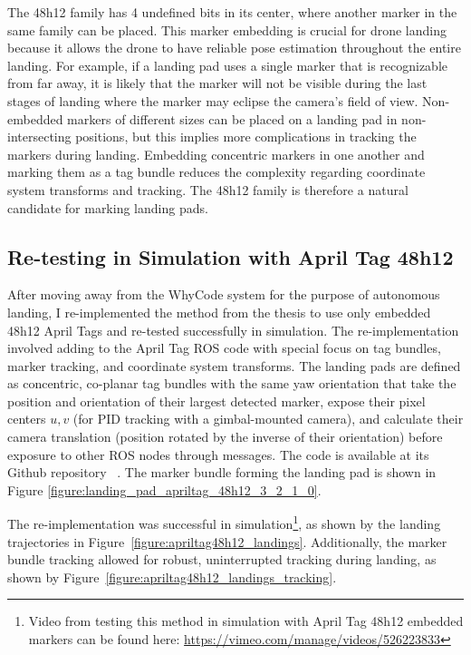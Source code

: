 The 48h12 family has 4 undefined bits in its center, where another marker in the same family can be placed.
This marker embedding is crucial for drone landing because it allows the drone to have
reliable pose estimation throughout the entire landing.
For example, if a landing pad uses a single marker that is recognizable from far away,
it is likely that the marker will not be visible during the last stages of landing
where the marker may eclipse the camera's field of view.
Non-embedded markers of different sizes can be placed on a landing pad in non-intersecting positions,
but this implies more complications in tracking the markers during landing.
Embedding concentric markers in one another and marking them as a tag bundle reduces the complexity
regarding coordinate system transforms and tracking.
The 48h12 family is therefore a natural candidate for marking landing pads.

\subsection{Re-testing in Simulation with April Tag 48h12}

After moving away from the WhyCode system for the purpose of autonomous landing, I re-implemented the method
from the thesis to use only embedded 48h12 April Tags and re-tested successfully in simulation.
The re-implementation involved adding to the April Tag ROS code with special focus on
tag bundles,
marker tracking,
and coordinate system transforms.
The landing pads are defined as concentric, co-planar tag bundles with the same yaw orientation
that take the position and orientation of their largest detected marker,
expose their pixel centers $u,v$ (for PID tracking with a gimbal-mounted camera),
and calculate their camera translation (position rotated by the inverse of their orientation)
before exposure to other ROS nodes through messages.
The code is available at its Github repository ~\cite{edited_apriltag}.
The marker bundle forming the landing pad is shown in Figure \ref{figure:landing_pad_apriltag_48h12_3_2_1_0}.

The re-implementation was successful in simulation\footnote{Video from testing this method in simulation with April Tag 48h12 embedded markers can be found here: \url{https://vimeo.com/manage/videos/526223833}}, as shown by the landing trajectories in Figure~\ref{figure:apriltag48h12_landings}.
Additionally, the marker bundle tracking allowed for robust, uninterrupted tracking during landing, as shown by Figure~\ref{figure:apriltag48h12_landings_tracking}.

